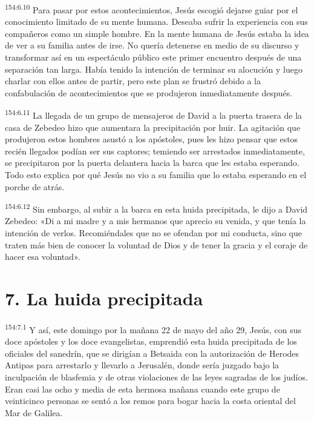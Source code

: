 \par 
\textsuperscript{154:6.10} Para pasar por estos acontecimientos, Jesús escogió dejarse guiar por el conocimiento limitado de su mente humana. Deseaba sufrir la experiencia con sus compañeros como un simple hombre. En la mente humana de Jesús estaba la idea de ver a su familia antes de irse. No quería detenerse en medio de su discurso y transformar así en un espectáculo público este primer encuentro después de una separación tan larga. Había tenido la intención de terminar su alocución y luego charlar con ellos antes de partir, pero este plan se frustró debido a la confabulación de acontecimientos que se produjeron inmediatamente después.

\par 
\textsuperscript{154:6.11} La llegada de un grupo de mensajeros de David a la puerta trasera de la casa de Zebedeo hizo que aumentara la precipitación por huir. La agitación que produjeron estos hombres asustó a los apóstoles, pues les hizo pensar que estos recién llegados podían ser sus captores; temiendo ser arrestados inmediatamente, se precipitaron por la puerta delantera hacia la barca que les estaba esperando. Todo esto explica por qué Jesús no vio a su familia que lo estaba esperando en el porche de atrás.

\par 
\textsuperscript{154:6.12} Sin embargo, al subir a la barca en esta huida precipitada, le dijo a David Zebedeo: «Di a mi madre y a mis hermanos que aprecio su venida, y que tenía la intención de verlos. Recomiéndales que no se ofendan por mi conducta, sino que traten más bien de conocer la voluntad de Dios y de tener la gracia y el coraje de hacer esa voluntad».

\section*{7. La huida precipitada}
\par 
\textsuperscript{154:7.1} Y así, este domingo por la mañana 22 de mayo del año 29, Jesús, con sus doce apóstoles y los doce evangelistas, emprendió esta huida precipitada de los oficiales del sanedrín, que se dirigían a Betsaida con la autorización de Herodes Antipas para arrestarlo y llevarlo a Jerusalén, donde sería juzgado bajo la inculpación de blasfemia y de otras violaciones de las leyes sagradas de los judíos. Eran casi las ocho y media de esta hermosa mañana cuando este grupo de veinticinco personas se sentó a los remos para bogar hacia la costa oriental del Mar de Galilea.

